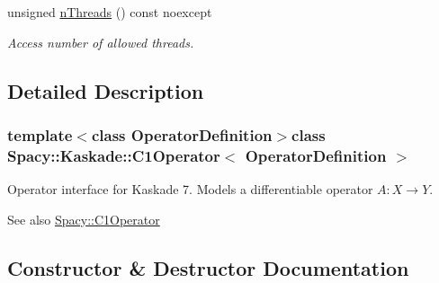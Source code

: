\begin{DoxyCompactItemize}
\item 
\hypertarget{classSpacy_1_1Mixin_1_1NumberOfThreads_a385963b95b5e1ddf422393146cc71ee1}{}unsigned \hyperlink{classSpacy_1_1Mixin_1_1NumberOfThreads_a385963b95b5e1ddf422393146cc71ee1}{n\+Threads} () const noexcept\label{classSpacy_1_1Mixin_1_1NumberOfThreads_a385963b95b5e1ddf422393146cc71ee1}

\begin{DoxyCompactList}\small\item\em Access number of allowed threads. \end{DoxyCompactList}\end{DoxyCompactItemize}


\subsection{Detailed Description}
\subsubsection*{template$<$class Operator\+Definition$>$class Spacy\+::\+Kaskade\+::\+C1\+Operator$<$ Operator\+Definition $>$}

Operator interface for Kaskade 7. Models a differentiable operator $A:X\rightarrow Y$. 

\begin{DoxySeeAlso}{See also}
\hyperlink{classSpacy_1_1C1Operator}{Spacy\+::\+C1\+Operator} 
\end{DoxySeeAlso}


\subsection{Constructor \& Destructor Documentation}
\hypertarget{classSpacy_1_1Kaskade_1_1C1Operator_aa31e9f54fcbb4eb6c40c1cd467d25836}{}
